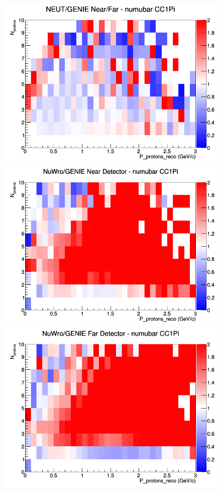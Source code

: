 \documentclass[12pt]{article}
\begin{document}
\begin{figure}[h]
\endminipage
{}
\includegraphics[width=\linewidth]{eff_N_P/LAr/protons/ratios/CC1Pi_NEUT_GENIE_numubar_NF_N_P.png}
\endminipage
\newline
{}
\includegraphics[width=\linewidth]{eff_N_P/LAr/protons/ratios/CC1Pi_NuWro_GENIE_numubar_near_N_P.png}
\endminipage
{}
\includegraphics[width=\linewidth]{eff_N_P/LAr/protons/ratios/CC1Pi_NuWro_GENIE_numubar_far_N_P.png}

\end{figure}
\end{document}
